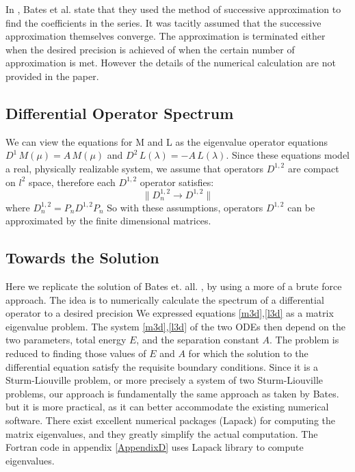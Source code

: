 In \cite{Bates1}, Bates et al. state that they used the method of successive approximation to find the coefficients in the series. It was tacitly assumed that the successive approximation themselves converge. The approximation is terminated either when the desired precision is achieved of when the certain number of approximation is met. However the details of the numerical calculation are not provided in the paper.

\subsection{Differential Operator Spectrum}

We can view the equations for M and L as the eigenvalue operator equations $ D^1\,M(\mu) = A\,M(\mu) $ and $ D^2\,L(\lambda)= -A\,L(\lambda) $.
Since these equations model a real, physically realizable system, we assume that operators $ D^{1,2} $  are compact on $ l^2 $ space, therefore each $ D^{1,2} $ operator satisfies:
\begin{equation}
\| D_n^{1,2} \rightarrow D^{1,2} \|
\end{equation}
where $ D_n^{1,2} = P_nD^{1,2}P_n $
So with these assumptions, operators $ D^{1,2} $ can be approximated by the finite dimensional matrices.

\subsection{Towards the Solution}

Here we replicate the solution of Bates et. all. \cite{Bates1}\cite{Bates2}, by using a more of a brute force approach. The idea is to numerically calculate the spectrum of a differential operator to a desired precision
We expressed equations \eqref{m3d},\eqref{l3d} as a matrix eigenvalue problem. 
The system \eqref{m3d},\eqref{l3d} of the two ODEs then depend on the two parameters, total energy $ E $, and the separation constant $ A $. The problem is reduced to finding those values of $ E $ and $ A $ for which the solution to the differential equation satisfy the requisite boundary conditions. 
Since it is a  Sturm-Liouville problem, or more precisely a system of two Sturm-Liouville problems, our approach is fundamentally the same approach as taken by Bates. but it is more practical, as it can better accommodate the existing numerical software. There exist excellent numerical packages (Lapack) \cite{Lapack1} for computing the matrix eigenvalues, and they greatly simplify the actual computation. The Fortran code in appendix \ref{AppendixD} uses Lapack library to compute eigenvalues.

